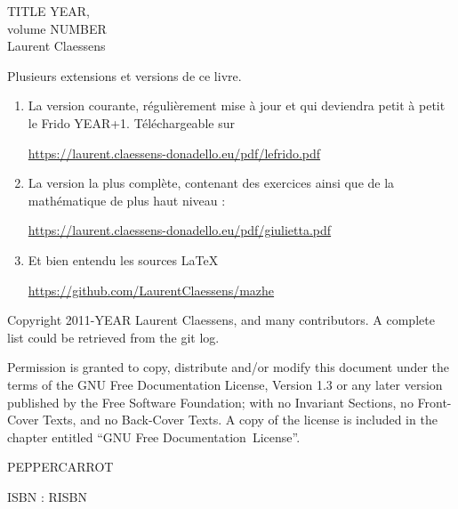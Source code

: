 \documentclass[a4paper,twoside,11pt]{book}
\begin{document}
\pagestyle{empty}

\phantom{Foo}
\newpage

\phantom{Foo}
\newpage

\begin{center}
    TITLE YEAR, \\
    volume NUMBER \\
    Laurent Claessens
\end{center}

\newpage

Plusieurs extensions et versions de ce livre.
\begin{enumerate}
    \item
        La version courante, régulièrement mise à jour et qui deviendra petit à petit le Frido YEAR+1. Téléchargeable sur
        \begin{center}
            \url{https://laurent.claessens-donadello.eu/pdf/lefrido.pdf}
        \end{center}
    \item
        La version la plus complète, contenant des exercices ainsi que de la mathématique de plus haut niveau :
        \begin{center}
            \url{https://laurent.claessens-donadello.eu/pdf/giulietta.pdf}
        \end{center}
    \item
        Et bien entendu les sources \LaTeX\
        \begin{center}
            \url{https://github.com/LaurentClaessens/mazhe}
        \end{center}
\end{enumerate}

\newpage

\phantom{un foobar bleuté}

\vfill

\begin{center}
Copyright 2011-YEAR  Laurent Claessens, and many contributors. A complete list could be retrieved from the git log.

Permission is granted to copy, distribute and/or modify this document under the terms of the GNU Free Documentation License, Version 1.3 or any later version published by the Free Software Foundation; with no Invariant Sections, no Front-Cover Texts, and no Back-Cover Texts. A copy of the license is included in the chapter entitled ``GNU Free Documentation~License''.
\end{center}

\begin{center}
    PEPPERCARROT
\end{center}

    \begin{center}
ISBN : RISBN
    \end{center}
\end{document}

